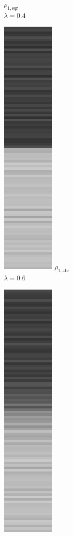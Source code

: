 \documentclass[onecolumn,final,a4paper,13pt,reqno]{siamart}
\begin{document}
\begin{figure}[t]
\begin{subfigure}[t]{0.08\textwidth}
		\scriptsize $\rho_{1,\text{sqr}}$\\[2px]
		\scriptsize $\lambda = 0.4$
	\end{subfigure}
	\begin{subfigure}[t]{0.08\textwidth}
		\includegraphics[scale=0.3]{pictures/denoising/signal/ipiano_absolute_06.png}
		\scriptsize $\rho_{1,\text{abs}}$\\[2px]
		\scriptsize $\lambda = 0.6$
	\end{subfigure}
	\begin{subfigure}[t]{0.08\textwidth}
		\includegraphics[scale=0.3]{pictures/denoising/signal/ipiano_squared_06.png}

\end{subfigure}
\end{figure}
\end{document}
